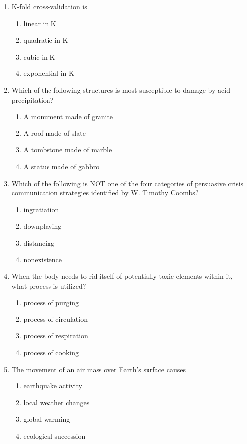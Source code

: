 \documentclass[12pt]{article}
\begin{document}
\begin{enumerate}[label=\arabic*.]
\begin{enumerate}[label=(\alph*)]
    \item alongside a friendly black hole
    \item away from a planet
    \item closer to a planet
    \item closer to the sun
\end{enumerate}
\item K-fold cross-validation is
\begin{enumerate}[label=(\alph*)]
    \item linear in K
    \item quadratic in K
    \item cubic in K
    \item exponential in K
\end{enumerate}
\item Which of the following structures is most susceptible to damage by acid precipitation?
\begin{enumerate}[label=(\alph*)]
    \item A monument made of granite
    \item A roof made of slate
    \item A tombstone made of marble
    \item A statue made of gabbro
\end{enumerate}
\item Which of the following is NOT one of the four categories of persuasive crisis communication strategies identified by W. Timothy Coombs?
\begin{enumerate}[label=(\alph*)]
    \item ingratiation
    \item downplaying
    \item distancing
    \item nonexistence
\end{enumerate}
\item When the body needs to rid itself of potentially toxic elements within it, what process is utilized?
\begin{enumerate}[label=(\alph*)]
    \item process of purging
    \item process of circulation
    \item process of respiration
    \item process of cooking
\end{enumerate}
\item The movement of an air mass over Earth's surface causes
\begin{enumerate}[label=(\alph*)]
    \item earthquake activity
    \item local weather changes
    \item global warming
    \item ecological succession
\end{enumerate}
\end{enumerate}
\end{document}
